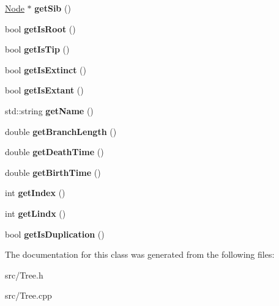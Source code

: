 \begin{DoxyCompactItemize}
\mbox{\hyperlink{class_node}{Node}} $\ast$ {\bfseries get\+Sib} ()
\item 
\mbox{\label{class_node_af0f5403714597e85ffc44ca4c3c00baf}} 
bool {\bfseries get\+Is\+Root} ()
\item 
\mbox{\label{class_node_a32e0f423b4875830d560d6342c7737e2}} 
bool {\bfseries get\+Is\+Tip} ()
\item 
\mbox{\label{class_node_aa4afb4b67529396862f5a35fdda0ecd4}} 
bool {\bfseries get\+Is\+Extinct} ()
\item 
\mbox{\label{class_node_a44384d048d2697672c267a999498c690}} 
bool {\bfseries get\+Is\+Extant} ()
\item 
\mbox{\label{class_node_a3e5ac6b5881a3a9d82f3112953c1e546}} 
std\+::string {\bfseries get\+Name} ()
\item 
\mbox{\label{class_node_a927f200650a747da81de2da4bd81847f}} 
double {\bfseries get\+Branch\+Length} ()
\item 
\mbox{\label{class_node_a3e018a6e27c4247ac427bec0e91a22f5}} 
double {\bfseries get\+Death\+Time} ()
\item 
\mbox{\label{class_node_adee404eab536649c75f13ab4294f4534}} 
double {\bfseries get\+Birth\+Time} ()
\item 
\mbox{\label{class_node_ab19ccd880a7acbe1efa28949c053fa58}} 
int {\bfseries get\+Index} ()
\item 
\mbox{\label{class_node_a5a7ba609fb5bca0b14b43b544cde229b}} 
int {\bfseries get\+Lindx} ()
\item 
\mbox{\label{class_node_a0d01c073850ce91054356c43583205b1}} 
bool {\bfseries get\+Is\+Duplication} ()
\end{DoxyCompactItemize}


The documentation for this class was generated from the following files\+:\begin{DoxyCompactItemize}
\item 
src/Tree.\+h\item 
src/Tree.\+cpp\end{DoxyCompactItemize}

